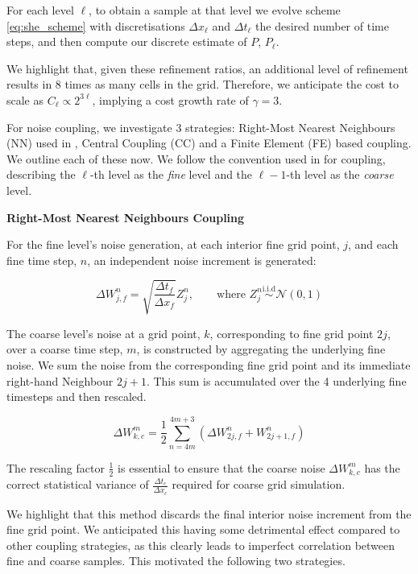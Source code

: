 For each level $\ell$, to obtain a sample at that level we evolve scheme \eqref{eq:she_scheme} 
with discretisations $\Delta x_\ell$ and $\Delta t_\ell$ the desired number of time steps, 
and then compute our discrete estimate of $P$, $P_\ell$. 

We highlight that, given these refinement ratios, an additional level 
of refinement results in 8 times as many cells in the grid. Therefore, 
we anticipate the cost to scale as $C_\ell \propto 2^{3\ell}$, implying a 
cost growth rate of $\gamma = 3$.

For noise coupling, we investigate 3 strategies: Right-Most Nearest Neighbours (NN)
used in \cite{cornalba2025multilevel}, Central Coupling (CC) and a Finite Element (FE)
based coupling. We outline each of these now. We follow the convention used in 
\cite{giles2015multilevel} for coupling, describing the $\ell$-th level as 
the \textit{fine} level and the $\ell - 1$-th level as the \textit{coarse} level.
\newline

\textbf{Right-Most Nearest Neighbours Coupling}

For the fine level's noise generation, at each interior fine grid point, $j$, and each fine 
time step, $n$, an independent noise increment is generated:

\begin{equation*}
    \Delta W_{j,f}^n = \sqrt{\frac{\Delta t_f}{\Delta x_f}} Z_j^n, \qquad \text{where } 
    Z_j^n \overset{\mathrm{i.i.d}}{\sim} \mathcal{N}(0,1)
\end{equation*}

The coarse level's noise at a grid point, $k$,
corresponding to fine grid point $2j$,
over a coarse time step, $m$, is constructed by 
aggregating the underlying fine noise. We sum 
the noise from the corresponding fine grid point
and its immediate right-hand Neighbour
$2j + 1$. This sum is accumulated over 
the 4 underlying fine timesteps 
and then rescaled.

\begin{equation*}
    \Delta W_{k,c}^m = \frac{1}{2} \sum_{n = 4m}^{4m+3}
    \left(\Delta W_{2j,f}^n + W_{2j+1, f}^n \right)
\end{equation*}

The rescaling factor $\frac{1}{2}$ is essential to 
ensure that the coarse noise $\Delta W_{k,c}^m$
has the correct statistical variance of 
$\frac{\Delta t_c}{\Delta x_c}$ required for 
coarse grid simulation.

We highlight that this method discards the final 
interior noise increment from the fine grid
point. We anticipated this having some 
detrimental effect compared to 
other coupling strategies, as 
this clearly leads to imperfect correlation
between fine and coarse samples.
This motivated the following two strategies.
\newline

